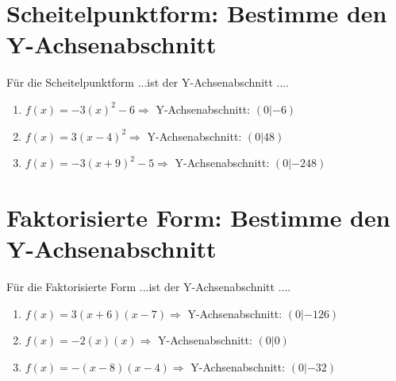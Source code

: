 \documentclass{article}%
\begin{document}
%
\section{Scheitelpunktform: Bestimme den Y{-}Achsenabschnitt}%
\label{sec:ScheitelpunktformBestimmedenY{-}Achsenabschnitt}%
Für die Scheitelpunktform ...ist der Y{-}Achsenabschnitt ....%
\begin{enumerate}[label=\alph*)]%
\item%
\newline\vspace{0.5cm}$f(x)=-3(x)^2 -6 \Rightarrow $ Y-Achsenabschnitt: $ (0|-6) $%
\item%
\newline\vspace{0.5cm}$f(x)=3(x-4)^2 \Rightarrow $ Y-Achsenabschnitt: $ (0|48) $%
\item%
\newline\vspace{0.5cm}$f(x)=-3(x+9)^2 -5 \Rightarrow $ Y-Achsenabschnitt: $ (0|-248) $%
\end{enumerate}

%
\section{Faktorisierte Form: Bestimme den Y{-}Achsenabschnitt}%
\label{sec:FaktorisierteFormBestimmedenY{-}Achsenabschnitt}%
Für die Faktorisierte Form ...ist der Y{-}Achsenabschnitt ....%
\begin{enumerate}[label=\alph*)]%
\item%
\newline\vspace{0.5cm}$f(x)=3(x+6)(x-7) \Rightarrow $ Y-Achsenabschnitt: $ (0|-126) $%
\item%
\newline\vspace{0.5cm}$f(x)=-2(x)(x) \Rightarrow $ Y-Achsenabschnitt: $ (0|0) $%
\item%
\newline\vspace{0.5cm}$f(x)=-(x-8)(x-4) \Rightarrow $ Y-Achsenabschnitt: $ (0|-32) $%
\end{enumerate}

%
\end{document}
